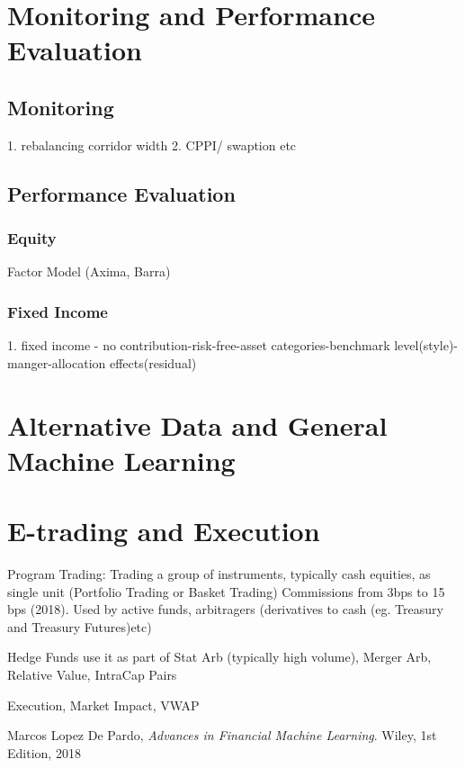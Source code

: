\documentclass[11pt, openany]{book}              %
\begin{document}
\chapter{Monitoring and Performance Evaluation}

\section{Monitoring}
    1. rebalancing corridor width
    2. CPPI/ swaption etc

\section{Performance Evaluation}

\subsection{Equity}

Factor Model (Axima, Barra) 
\subsection{Fixed Income}

    1. fixed income - no contribution-risk-free-asset categories-benchmark level(style)-manger-allocation effects(residual) 


\chapter{Alternative Data and General Machine Learning}

\chapter{E-trading and Execution}

Program Trading: Trading a group of instruments, typically cash equities, as single unit (Portfolio Trading or Basket Trading) Commissions from 3bps to 15 bps (2018). Used by active funds, arbitragers (derivatives to cash (eg. Treasury and Treasury Futures)etc)

Hedge Funds use it as part of Stat Arb (typically high volume), Merger Arb, Relative Value, IntraCap Pairs


Execution, Market Impact, VWAP 


\begin{thebibliography}{999}

  Marcos Lopez De Pardo, 
  \emph{Advances in Financial Machine Learning}.
  Wiley,
  1st Edition,
  2018

\end{thebibliography}
 
\end{document}
